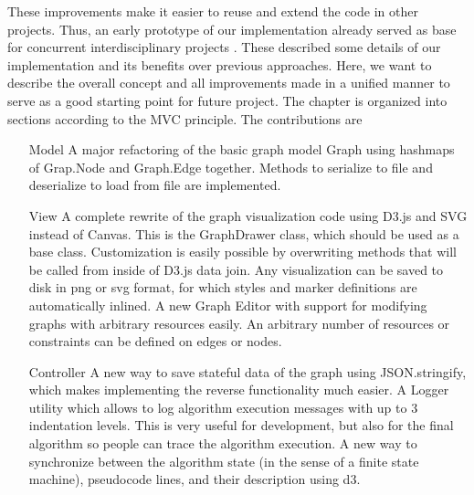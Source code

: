 %

These improvements make it easier to reuse and extend the code in other projects. Thus, an early prototype of our implementation already served as base for concurrent interdisciplinary projects \cite{fischer2016idp,feil2016idp}. These described some details of our implementation and its benefits over previous approaches. Here, we want to describe the overall concept and all improvements made in a unified manner to serve as a good starting point for future project. The chapter is organized into sections according to the MVC principle. The contributions are
\begin{itemize}
	\item[Model] A major refactoring of the basic graph model Graph using hashmaps of Grap.Node and Graph.Edge together. Methods to serialize to file and deserialize to load from file are implemented.
	\item[View] A complete rewrite of the graph visualization code using D3.js and SVG instead of Canvas. This is the GraphDrawer class, which should be used as a base class. Customization is easily possible by overwriting methods that will be called from inside of D3.js data join. Any visualization can be saved to disk in png or svg format, for which styles and marker definitions are automatically inlined. A new Graph Editor with support for modifying graphs with arbitrary resources easily. An arbitrary number of resources or constraints can be defined on edges or nodes.
	\item[Controller] A new way to save stateful data of the graph using JSON.stringify, which makes implementing the reverse functionality much easier. A Logger utility which allows to log algorithm execution messages with up to 3 indentation levels. This is very useful for development, but also for the final algorithm so people can trace the algorithm execution. A new way to synchronize between the algorithm state (in the sense of a finite state machine), pseudocode lines, and their description using d3.
\end{itemize}


